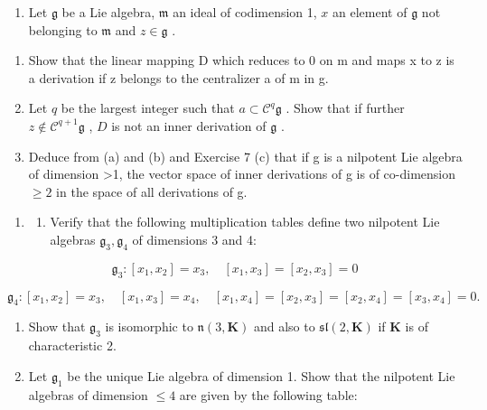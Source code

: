 \begin{enumerate}
\def\labelenumi{\arabic{enumi}.}
\setcounter{enumi}{7}
\tightlist
\item
  Let \(\mathfrak{g}\) be a Lie algebra, \(\mathfrak{m}\) an ideal of codimension 1, \(x\) an element of \(\mathfrak{g}\) not belonging to \(\mathfrak{m}\) and \(z \in \mathfrak{g}\) .
\end{enumerate}

\begin{enumerate}
\def\labelenumi{(\alph{enumi})}
\item
  Show that the linear mapping D which reduces to 0 on m and maps x to z is a derivation if z belongs to the centralizer a of m in g.
\item
  Let \(q\) be the largest integer such that \(a \subset \mathcal{C}^q\mathfrak{g}\) . Show that if further \(z \notin \mathcal{C}^{q+1}\mathfrak{g}\) , \(D\) is not an inner derivation of \(\mathfrak{g}\) .
\item
  Deduce from (a) and (b) and Exercise 7 (c) that if g is a nilpotent Lie algebra of dimension \textgreater1, the vector space of inner derivations of g is of co-dimension \(\geqslant2\) in the space of all derivations of g.
\end{enumerate}

\begin{enumerate}
\def\labelenumi{\arabic{enumi}.}
\setcounter{enumi}{8}
\tightlist
\item
  \begin{enumerate}
  \def\labelenumii{(\alph{enumii})}
  \tightlist
  \item
    Verify that the following multiplication tables define two nilpotent Lie algebras \(\mathfrak{g}_3, \mathfrak{g}_4\) of dimensions 3 and 4:
  \end{enumerate}
\end{enumerate}

\[
\mathfrak {g} _ {3}: \left[ x _ {1}, x _ {2} \right] = x _ {3}, \quad \left[ x _ {1}, x _ {3} \right] = \left[ x _ {2}, x _ {3} \right] = 0
\]

\[
\mathfrak {g} _ {4}: \left[ x _ {1}, x _ {2} \right] = x _ {3}, \quad \left[ x _ {1}, x _ {3} \right] = x _ {4}, \quad \left[ x _ {1}, x _ {4} \right] = \left[ x _ {2}, x _ {3} \right] = \left[ x _ {2}, x _ {4} \right] = \left[ x _ {3}, x _ {4} \right] = 0.
\]

\begin{enumerate}
\def\labelenumi{(\alph{enumi})}
\setcounter{enumi}{1}
\item
  Show that \(\mathfrak{g}_3\) is isomorphic to \(\mathfrak{n}(3, \mathbf{K})\) and also to \(\mathfrak{sl}(2, \mathbf{K})\) if \(\mathbf{K}\) is of characteristic 2.
\item
  Let \(\mathfrak{g}_1\) be the unique Lie algebra of dimension 1. Show that the nilpotent Lie algebras of dimension \(\leqslant 4\) are given by the following table:
\end{enumerate}

